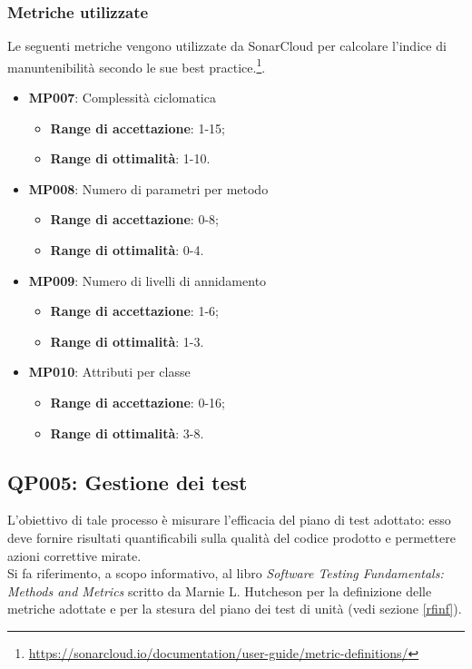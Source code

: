 \subsubsection{Metriche utilizzate}
Le seguenti metriche vengono utilizzate da SonarCloud per calcolare l'indice di manuntenibilità secondo le sue best practice.\footnote{\url{https://sonarcloud.io/documentation/user-guide/metric-definitions/}}.
\begin{itemize}
	\item \textbf{MP007}: Complessità ciclomatica
	\begin{itemize}
		\item \textbf{Range di accettazione}: 1-15;
		\item \textbf{Range di ottimalità}: 1-10.
	\end{itemize}
	\item \textbf{MP008}: Numero di parametri per metodo
	\begin{itemize}
		\item \textbf{Range di accettazione}: 0-8;
		\item \textbf{Range di ottimalità}: 0-4.
	\end{itemize}
	\item \textbf{MP009}: Numero di livelli di annidamento
	\begin{itemize}
		\item \textbf{Range di accettazione}: 1-6;
		\item \textbf{Range di ottimalità}: 1-3.
	\end{itemize}
	\item \textbf{MP010}: Attributi per classe
	\begin{itemize}
		\item \textbf{Range di accettazione}: 0-16;
		\item \textbf{Range di ottimalità}: 3-8.
	\end{itemize}
		
\end{itemize}

\subsection{QP005: Gestione dei test}\label{test}\label{pro5}
L'obiettivo di tale processo è misurare l'efficacia del piano di test adottato: esso deve fornire risultati quantificabili sulla qualità del codice prodotto e permettere azioni correttive mirate.\\
Si fa riferimento, a scopo informativo, al libro \textit{Software Testing Fundamentals: Methods and Metrics} scritto da Marnie L. Hutcheson per la definizione delle metriche adottate e per la stesura del piano dei test di unità (vedi sezione \ref{rfinf}).
